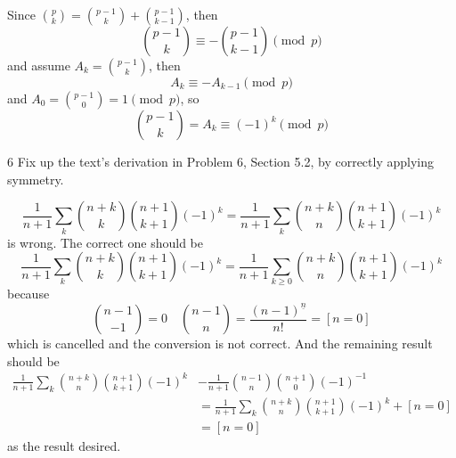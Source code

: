 \documentclass[a4paper,12pt]{article}
\makeatletter
\newtheorem*{solution}{Solution}
\theoremstyle{definition}
\renewenvironment{solution}[1][Solution] {\par\pushQED{\qed}\normalfont\topsep6\p@\@plus6\p@\relax\trivlist\item[\hskip\labelsep\bfseries#1\@addpunct{.}]\ignorespaces}{\popQED\endtrivlist\@endpefalse} \makeatother
\newenvironment{problems}{\begin{list}{}{\renewcommand{\makelabel}[1]{\textbf{##1}\hfil}}}{\end{list}}
\makeatother
\begin{document}
\begin{problems}
\begin{solution}
        Since $\binom{p}{k} = \binom{p-1}{k} + \binom{p-1}{k-1}$, 
        then
        \begin{equation*}
            \binom{p-1}{k} \equiv -\binom{p-1}{k-1} \pmod{p}
        \end{equation*}
        and assume $A_k=\binom{p-1}{k}$, then
        \begin{equation*}
            A_k \equiv -A_{k-1} \pmod{p}
        \end{equation*}
        and $A_0=\binom{p-1}{0}=1 \pmod{p}$, so
        \begin{equation*}
            \binom{p-1}{k} =  A_k \equiv (-1)^k \pmod{p}
        \end{equation*}
    \end{solution} 
    \item[6] Fix up the text's derivation in Problem 6, Section 5.2, by correctly applying symmetry.
    \begin{solution}
        \begin{equation*}
            \frac{1}{n+1}\sum_k \binom{n+k}{k}\binom{n+1}{k+1}(-1)^k = \frac{1}{n+1}\sum_{k} \binom{n+k}{n}\binom{n+1}{k+1}(-1)^k 
        \end{equation*}
        is wrong. The correct one should be
        \begin{equation*}
            \frac{1}{n+1}\sum_k \binom{n+k}{k}\binom{n+1}{k+1}(-1)^k = \frac{1}{n+1}\sum_{k\geq 0} \binom{n+k}{n}\binom{n+1}{k+1}(-1)^k
        \end{equation*}
        because 
        \begin{equation*}
            \binom{n-1}{-1} = 0\quad \binom{n-1}{n}=\frac{(n-1)^{\underline{n}}}{n!} = [n=0]
        \end{equation*}
        which is cancelled and the conversion is not correct.
        And the remaining result should be
        \begin{align*}
            \frac{1}{n+1}\sum_{k} \binom{n+k}{n}\binom{n+1}{k+1}(-1)^k &- \frac{1}{n+1}\binom{n-1}{n}\binom{n+1}{0}(-1)^{-1} \\
            &= \frac{1}{n+1}\sum_{k} \binom{n+k}{n}\binom{n+1}{k+1}(-1)^k + [n=0] \\
            &= [n=0]
        \end{align*}
        as the result desired.
    \end{solution} 

\end{problems}
\end{document}
